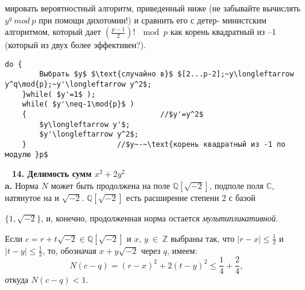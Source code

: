 \documentclass{mai_book}
\begin{document}
мировать вероятностный алгоритм, приведенный ниже (не забывайте\linebreak
вычислять $y^q~mod~p$ при помощи дихотомии!) и сравнить его с детер­-\linebreak
министским алгоритмом, который дает $(\frac{p-1}{2})!~\mod{p}$ как корень\linebreak 
ква­дратный из --1 (который из двух более эффективен?).\\
\begin{lstlisting}[mathescape=true,showspaces=false]
	do {
		Выбрать $y$ $\text{случайно в}$ $[2...p-2];~y\longleftarrow y^q\mod{p};~y'\longleftarrow y^2$;
	}while( $y'=1$ );
	while( $y'\neq-1\mod{p}$ )
	{		 						//$y'=y^2$
		$y\longleftarrow y'$;
		$y'\longleftarrow y^2$;
	}     				  //$y~-~\text{корень квадратный из -1 по модулю }p$
\end{lstlisting}
\ \newline
\noindent\textbf{14. Делимость сумм $x^2+2y^2$} \newline 
\\
\hspace*{15pt}\textbf{a.} Норма $N$ может быть продолжена на поле $\mathbb{Q}[\sqrt{-2}]$, подполе поля\linebreak
$\mathbb{C}$,\: натянутое\: на\: и\:\: $\sqrt{-2}$.\:\: $\mathbb{Q}[\sqrt{-2}]$\:\: есть\: расширение\: степени 2 с базой%
\pagebreak
%

\noindent $\{1,\sqrt{-2}\}$, и, конечно, продолженная норма остается \textit{мультипликативной}.

Если $c=r+t\sqrt{-2}\in\mathbb{Q}[\sqrt{-2}]$ и $x$, $y~\in~\mathbb{Z}$ выбраны так, что $|r-x|\leqslant\frac{1}{2}$\linebreak
и $|t-y|\leqslant\frac{1}{2}$, то, обозначая $x+y\sqrt{-2}$ через $q$, имеем:
$$ N(c-q)=(r-x)^2+2(t-y)^2\leqslant\frac{1}{4}+\frac{2}{4},$$
откуда $N(c-q)<1$.
\end{document}
